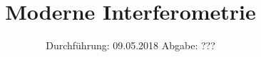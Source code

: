 

\subject{V64}
\title{\texorpdfstring{ Moderne Interferometrie}{}}
\date{
	Durchführung: 09.05.2018
	\hspace{4em}
	Abgabe: ???
}


	\maketitle
	\newpage
	\tableofcontents
	\newpage
	
	
	
	
	
	
	\newpage

	\printbibliography

